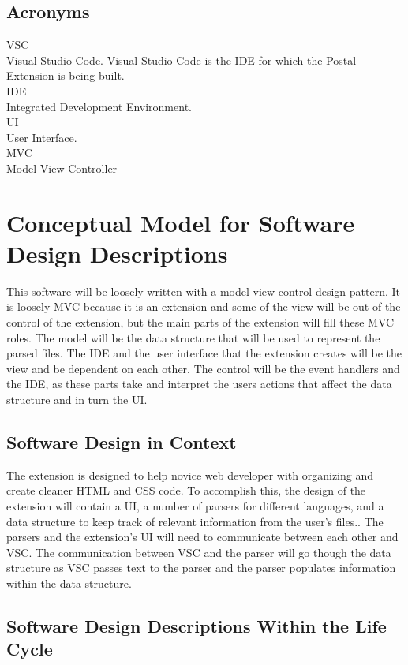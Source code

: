 \documentclass[letterpaper,10pt,titlepage,draftclsnofoot,onecolumn,onesided] {IEEEtran}
\begin{document}
\subsection{Acronyms}
VSC \\
Visual Studio Code. Visual Studio Code is the IDE for which the Postal Extension is being built. \\
IDE \\
Integrated Development Environment. \\
UI \\
User Interface. \\
MVC \\
Model-View-Controller


\section{Conceptual Model for Software Design Descriptions}
This software will be loosely written with a model view control design pattern.
It is loosely MVC because it is an extension and some of the view will be out of the control of the extension, but the main parts of the extension will fill these MVC roles.
The model will be the data structure that will be used to represent the parsed files. 
The IDE and the user interface that the extension creates will be the view and be dependent on each other.
The control will be the event handlers and the IDE, as these parts take and interpret the users actions that affect the data structure and in turn the UI.

\subsection{Software Design in Context}
The extension is designed to help novice web developer with organizing and create cleaner HTML and CSS code. 
To accomplish this, the design of the extension will contain a UI, a number of parsers for different languages, and a data structure to keep track of relevant information from the user's files..
The parsers and the extension's UI will need to communicate between each other and VSC.
The communication between VSC and the parser will go though the data structure as VSC passes text to the parser and the parser populates information within the data structure.

\subsection{Software Design Descriptions Within the Life Cycle}
\end{document}

